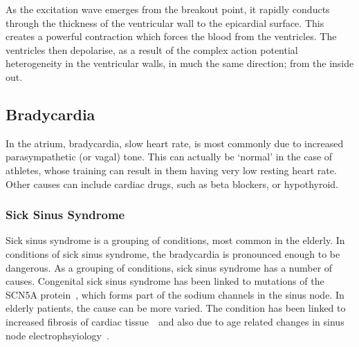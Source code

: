 As the excitation wave emerges from the breakout point, it rapidly conducts
through the thickness of the ventricular wall to the epicardial surface.
This creates a powerful contraction which forces the blood from the ventricles.
The ventricles then depolarise, as a result of the complex action potential
heterogeneity in the ventricular walls, in much the same direction; from the
inside out.

\subsection{Bradycardia}

In the atrium, bradycardia, slow heart rate, is most commonly due to increased
parasympathetic (or vagal) tone.
This can actually be `normal' in the case of athletes, whose training can result
in them having very low resting heart rate.
Other causes can include cardiac drugs, such as beta blockers, or hypothyroid.

\subsubsection{Sick Sinus Syndrome}

Sick sinus syndrome is a grouping of conditions, most common in the elderly.
In conditions of sick sinus syndrome, the bradycardia is pronounced enough to be
dangerous.
As a grouping of conditions, sick sinus syndrome has a number of causes.
Congenital sick sinus syndrome has been linked to mutations of the SCN5A
protein~\cite{Benson2003}, which forms part of the sodium channels in the sinus
node.
In elderly patients, the cause can be more varied.
The condition has been linked to increased fibrosis of cardiac
tissue~\cite{Kohl2005}\ and also due to age related changes in sinus node
electrophsyiology~\cite{Alings1993}.
